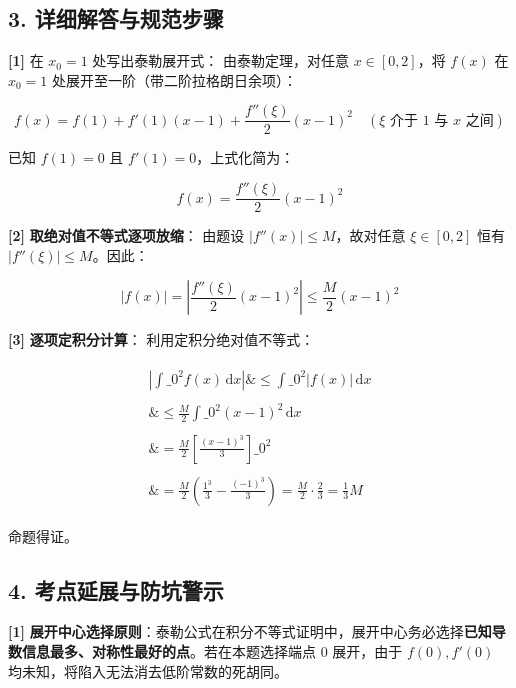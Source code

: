\documentclass[11pt,a4paper,UTF8]{ctexart}
\begin{document}
\subsection{3. 详细解答与规范步骤}
\begin{solbox}[分步推导与答题规范]
\textbf{[1]}  \textit{}在 $x_0 = 1$ 处写出泰勒展开式\textit{}：
由泰勒定理，对任意 $x \in [0, 2]$，将 $f(x)$ 在 $x_0 = 1$ 处展开至一阶（带二阶拉格朗日余项）：

\begin{equation*}
f(x) = f(1) + f'(1)(x - 1) + \frac{f''(\xi)}{2}(x - 1)^2 \quad (\xi \text{ 介于 } 1 \text{ 与 } x \text{ 之间})
\end{equation*}

已知 $f(1) = 0$ 且 $f'(1) = 0$，上式化简为：

\begin{equation*}
f(x) = \frac{f''(\xi)}{2}(x - 1)^2
\end{equation*}


\textbf{[2]}  \textbf{取绝对值不等式逐项放缩}：
由题设 $|f''(x)| \le M$，故对任意 $\xi \in [0, 2]$ 恒有 $|f''(\xi)| \le M$。因此：

\begin{equation*}
|f(x)| = \left| \frac{f''(\xi)}{2}(x - 1)^2 \right| \le \frac{M}{2}(x - 1)^2
\end{equation*}


\textbf{[3]}  \textbf{逐项定积分计算}：
利用定积分绝对值不等式：

\begin{align*}
\begin{aligned}
\left| \int\_0^2 f(x)\,\mathrm{d}x \right| \&\le \int\_0^2 |f(x)|\,\mathrm{d}x \\ \\
\&\le \frac{M}{2} \int\_0^2 (x - 1)^2\,\mathrm{d}x \\ \\
\&= \frac{M}{2} \left[ \frac{(x - 1)^3}{3} \right]\_0^2 \\ \\
\&= \frac{M}{2} \left( \frac{1^3}{3} - \frac{(-1)^3}{3} \right) = \frac{M}{2} \cdot \frac{2}{3} = \frac{1}{3}M
\end{aligned}
\end{align*}

命题得证。
\end{solbox}


\subsection{4. 考点延展与防坑警示}
\begin{solbox}[分步推导与答题规范]
\textbf{[1]}  \textbf{展开中心选择原则}：泰勒公式在积分不等式证明中，展开中心务必选择\textbf{已知导数信息最多、对称性最好的点}。若在本题选择端点 $0$ 展开，由于 $f(0), f'(0)$ 均未知，将陷入无法消去低阶常数的死胡同。
\end{solbox}
\end{document}
